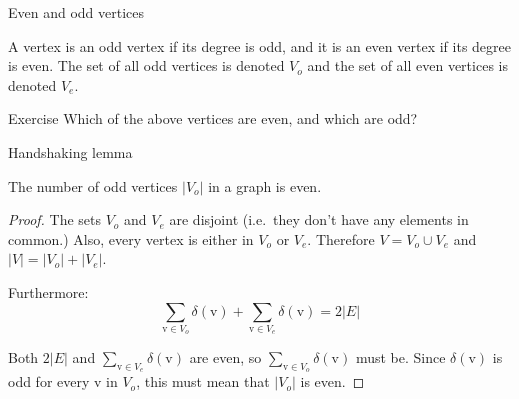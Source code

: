 \documentclass{beamer}
\begin{document}
  \begin{frame}{Even and odd vertices}
    \vspace{-4mm}
    \begin{definition}
      A vertex is an odd vertex if its degree is odd, and it is an even vertex if its degree is even.
      The set of all odd vertices is denoted $V_o$ and the set of all even vertices is denoted $V_e$.
    \end{definition}
    \begin{center}
    \end{center}
    \begin{block}{Exercise}
      Which of the above vertices are even, and which are odd?
    \end{block}
  \end{frame}
  
  \begin{frame}{Handshaking lemma}
  
    \begin{lemma}
      The number of odd vertices $| V_o |$ in a graph is even.
    \end{lemma}
  
    \begin{proof}
      The sets $V_o$ and $V_e$ are disjoint (i.e.\ they don't have any elements in common.)
      Also, every vertex is either in $V_o$ or $V_e$.
      Therefore $V = V_o \cup V_e$ and $|V| = |V_o| + |V_e|$.
      
      Furthermore:
        \[ \sum_{\mathrm{v} \in V_o} \delta(\mathrm{v}) + \sum_{\mathrm{v} \in V_e} \delta(\mathrm{v}) = 2 |E| \]
  
      Both $2|E|$ and $\sum_{\mathrm{v} \in V_e} \delta(\mathrm{v})$ are even, so $\sum_{\mathrm{v} \in V_o} \delta(\mathrm{v})$ must be.
      Since $\delta(\mathrm{v})$ is odd for every $\mathrm{v}$ in $V_o$, this must mean that $|V_o|$ is even.
    \end{proof}
  
  \end{frame}
  
\end{document}
